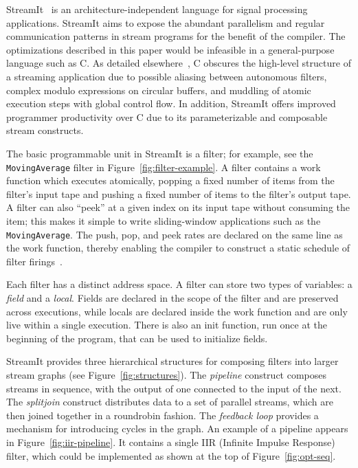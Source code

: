 \label{sec:background}

StreamIt~\cite{streamitcc} is an architecture-independent language for
signal processing applications.  StreamIt aims to expose the abundant
parallelism and regular communication patterns in stream programs for
the benefit of the compiler.  The optimizations described in this
paper would be infeasible in a general-purpose language such as C.  As
detailed elsewhere~\cite{streamitcc}, C obscures the high-level
structure of a streaming application due to possible aliasing between
autonomous filters, complex modulo expressions on circular buffers,
and muddling of atomic execution steps with global control flow.
In addition, StreamIt offers improved programmer productivity over C
due to its parameterizable and composable stream constructs.

The basic programmable unit in StreamIt is a filter; for example, see
the {\tt MovingAverage} filter in Figure~\ref{fig:filter-example}.  A
filter contains a work function which executes atomically, popping a
fixed number of items from the filter's input tape and pushing a fixed
number of items to the filter's output tape.  A filter can also
``peek'' at a given index on its input tape without consuming the
item; this makes it simple to write sliding-window applications such
as the {\tt MovingAverage}.  The push, pop, and peek rates are
declared on the same line as the work function, thereby enabling the
compiler to construct a static schedule of filter
firings~\cite{lee87static}.

Each filter has a distinct address space.  A filter can store two
types of variables: a {\it field} and a {\it local}.  Fields are
declared in the scope of the filter and are preserved across
executions, while locals are declared inside the work function and are
only live within a single execution.  There is also an init function,
run once at the beginning of the program, that can be used to
initialize fields.

StreamIt provides three hierarchical structures for composing filters
into larger stream graphs (see Figure~\ref{fig:structures}).  The {\it
pipeline} construct composes streams in sequence, with the output of
one connected to the input of the next.  The {\it splitjoin} construct
distributes data to a set of parallel streams, which are then joined
together in a roundrobin fashion.  The {\it feedback loop} provides a
mechanism for introducing cycles in the graph.  An example of a
pipeline appears in Figure~\ref{fig:iir-pipeline}.  It contains a
single IIR (Infinite Impulse Response) filter, which could be
implemented as shown at the top of Figure~\ref{fig:opt-seq}.

